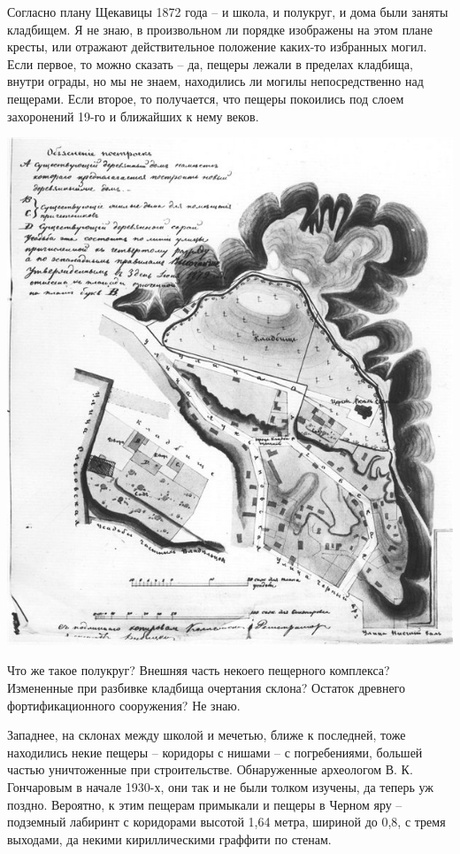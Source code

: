 Согласно плану Щекавицы 1872 года – и школа, и полукруг, и дома были заняты кладбищем. Я не знаю, в произвольном ли порядке изображены на этом плане кресты, или отражают действительное положение каких-то избранных могил. Если первое, то можно сказать – да, пещеры лежали в пределах кладбища, внутри ограды, но мы не знаем, находились ли могилы непосредственно над пещерами. Если второе, то получается, что пещеры покоились под слоем захоронений 19-го и ближайших к нему веков. 

\begin{center}
\includegraphics[width=\linewidth]{chast-colebanie-osnov/sheka/1872-shekavica.jpg}
\end{center}

Что же такое полукруг? Внешняя часть некоего пещерного комплекса? Измененные при разбивке кладбища очертания склона? Остаток древнего фортификационного сооружения? Не знаю.

Западнее, на склонах между школой и мечетью, ближе к последней, тоже находились некие пещеры – коридоры с нишами – с погребениями, большей частью уничтоженные при строительстве. Обнаруженные археологом В. К. Гончаровым в начале 1930-х, они так и не были толком изучены, да теперь уж поздно. Вероятно, к этим пещерам примыкали и пещеры в Черном яру – подземный лабиринт с коридорами высотой 1,64 метра, шириной до 0,8, с тремя выходами, да некими кириллическими граффити по стенам. 

